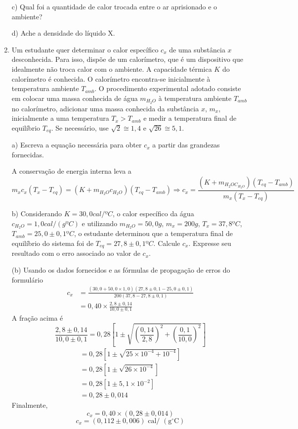 \begin{enumerate}[start=1,label={\bfseries Q\arabic*.}]
\resposta

c) Qual foi a quantidade de calor trocada entre o ar aprisionado e o ambiente?

\resposta

d) Ache a densidade do líquido X.

\resposta





\item Um estudante quer determinar o calor específico $c_{x}$ de uma substância $x$ desconhecida. Para isso, dispõe de um calorímetro, que é um dispositivo que idealmente não troca calor com o ambiente. A capacidade térmica $K$ do calorímetro é conhecida. O calorímetro encontra-se inicialmente à temperatura ambiente $T_{amb}$. O procedimento experimental adotado consiste em colocar uma massa conhecida de água $m_{H_{2}O}$ à temperatura ambiente $T_{amb}$ no calorímetro, adicionar uma massa conhecida da substância $x$, $m_{x}$, inicialmente a uma temperatura $T_{x} > T_{amb}$ e medir a temperatura final de equilíbrio $T_{eq}$. Se necessário, use $\sqrt{2} \cong 1,4$ e $\sqrt{26} \cong 5,1$.


a) Escreva a equação necessária para obter $c_{x}$ a partir das grandezas fornecidas.

\resposta A conservação de energia interna leva a
$$
m_{x} c_{x}\left(T_{x}-T_{e q}\right)=\left(K+m_{H_{2} O} c_{H_{2} O}\right)\left(T_{e q}-T_{a m b}\right) \Rightarrow c_{x}=\frac{\left(K+m_{H_{2} O C_{H_{2} O}}\right)\left(T_{e q}-T_{a m b}\right)}{m_{x}\left(T_{x}-T_{e q}\right)}
$$


b) Considerando $K = 30,0 cal/ºC$, o calor específico da água $c_{H_{2}O} = 1,0 cal/(g ºC)$ e utilizando $m_{H_{2}O} = 50,0 g$, $m_{x} = 200 g$, $T_{x} = 37,8 ºC$, $T_{amb} = 25,0 \pm 0,1 ºC$, o estudante determinou que a temperatura final de equilíbrio do sistema foi de $T_{eq} = 27,8 \pm 0,1 ºC$. Calcule $c_{x}$. Expresse seu resultado com o erro associado ao valor de $c_{x}$.

\resposta (b) Usando os dados fornecidos e as fórmulas de propagação de erros do formulário
$$
\begin{aligned}
c_{x} &=\frac{(30,0+50,0 \times 1,0)(27,8 \pm 0,1-25,0 \pm 0,1)}{200(37,8-27,8 \pm 0,1)} \\
&=0,40 \times \frac{2,8 \pm 0,14}{10,0 \pm 0,1}
\end{aligned}
$$
A fração acima é
$$
\frac{2,8 \pm 0,14}{10,0 \pm 0,1}=0,28[1 \pm \sqrt{\left(\frac{0,14}{2,8}\right)^{2}+\left(\frac{0,1}{10,0}\right)^{2}}]
$$
$$
\begin{array}{l}
=0,28[1 \pm \sqrt{25 \times 10^{-4}+10^{-4}}] \\
=0,28[1 \pm \sqrt{26 \times 10^{-4}}] \\
=0,28\left[1 \pm 5,1 \times 10^{-2}\right] \\
=0,28 \pm 0,014
\end{array}
$$
Finalmente,
$$
c_{x}=0,40 \times(0,28 \pm 0,014)
$$
$$
c_{x}=(0,112 \pm 0,006) \text { cal/ }\left(\mathrm{g}^{\circ} \mathrm{C}\right)
$$





\end{enumerate}
